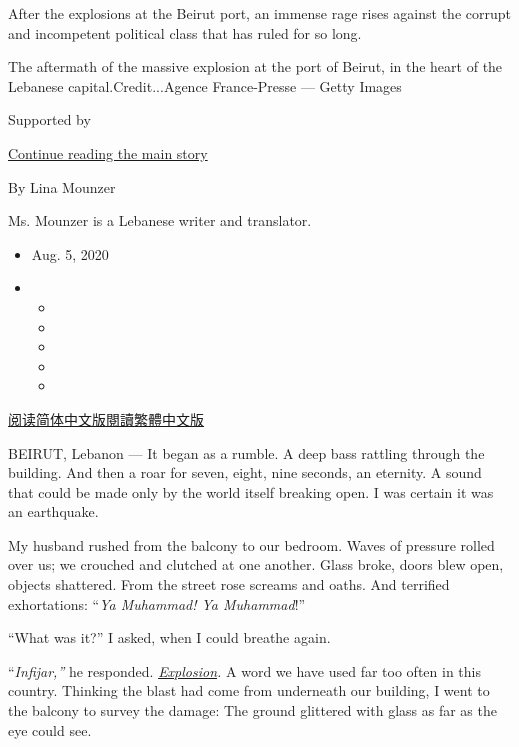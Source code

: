 After the explosions at the Beirut port, an immense rage rises against
the corrupt and incompetent political class that has ruled for so long.

The aftermath of the massive explosion at the port of Beirut, in the
heart of the Lebanese capital.Credit...Agence France-Presse --- Getty
Images

Supported by

\protect\hyperlink{after-sponsor}{Continue reading the main story}

By Lina Mounzer

Ms. Mounzer is a Lebanese writer and translator.

\begin{itemize}
\item
  Aug. 5, 2020
\item
  \begin{itemize}
  \item
  \item
  \item
  \item
  \item
  \end{itemize}
\end{itemize}

\href{https://cn.nytimes.com/opinion/20200806/beirut-port-explosions/}{阅读简体中文版}\href{https://cn.nytimes.com/opinion/20200806/beirut-port-explosions/zh-hant/}{閱讀繁體中文版}

BEIRUT, Lebanon --- It began as a rumble. A deep bass rattling through
the building. And then a roar for seven, eight, nine seconds, an
eternity. A sound that could be made only by the world itself breaking
open. I was certain it was an earthquake.

My husband rushed from the balcony to our bedroom. Waves of pressure
rolled over us; we crouched and clutched at one another. Glass broke,
doors blew open, objects shattered. From the street rose screams and
oaths. And terrified exhortations: ``\emph{Ya Muhammad! Ya Muhammad}!''

``What was it?'' I asked, when I could breathe again.

``\emph{Infijar,''} he responded.
\href{https://www.nytimes.com/2020/08/07/world/middleeast/lebanon-explosion-ship.html}{\emph{Explosion}}\emph{.}
A word we have used far too often in this country. Thinking the blast
had come from underneath our building, I went to the balcony to survey
the damage: The ground glittered with glass as far as the eye could see.

